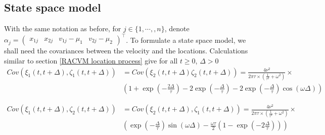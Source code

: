 \documentclass[11pt]{article}
\newcommand {\1}{\mathbb{1}}
\theoremstyle{definition}
\theoremstyle{remark}
\theoremstyle{remark}
\begin{document}
\subsection{State space model}
With the same notation as before, for $j \in \{1,\cdots,,n\}$, denote $\alpha_j=\begin{pmatrix} x_{1j} & x_{2j} & v_{1j}-\mu_1 & v_{2j}-\mu_2 \end{pmatrix}^\top$.
To formulate a state space model, we shall need the covariances between the velocity and the locations.
Calculations similar to  section \ref{RACVM location process} give for all $t \geq 0$, $\Delta >0$
\begin{align*}
	Cov(\xi_1(t,t+\Delta),\zeta_1(t,t+\Delta))&=Cov(\xi_2(t,t+\Delta)\zeta_2(t,t+\Delta))=\frac{4\nu^2}{2 \pi \tau \times \left( \frac{1}{\tau^2}+\omega^2\right)} \times \\
	& \left( 1+\exp\left( -\frac{2\Delta}{\tau}\right)-2\exp\left( -\frac{\Delta}{\tau}\right)-2\exp\left( -\frac{\Delta}{\tau}\right) \cos(\omega \Delta)\right)
\end{align*}

\begin{align*}
	Cov(\xi_1(t,t+\Delta),\zeta_2(t,t+\Delta))&=Cov(\xi_2(t,t+\Delta),\zeta_1(t,t+\Delta))=\frac{4\nu^2}{2 \pi \tau \times \left( \frac{1}{\tau^2}+\omega^2\right)} \times \\
	&\left( \exp\left( -\frac{\Delta}{\tau}\right) \sin(\omega \Delta)-\frac{\omega \tau}{2} \left(1-\exp\left( -2 \frac{\Delta}{\tau}\right) \right)\right)
\end{align*}
\end{document}
